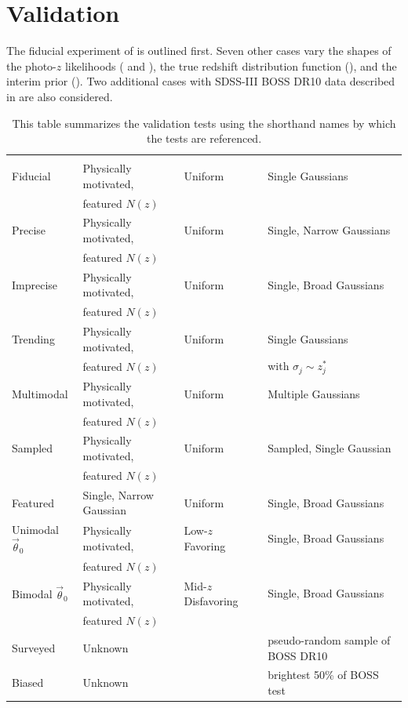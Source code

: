 \section{Validation}

The fiducial experiment of  is outlined first. 
Seven other cases vary the shapes of the photo-$z$ likelihoods ( and ), the true redshift distribution function (), and the interim prior ().  
Two additional cases with SDSS-III BOSS DR10 data described in  are also considered.

\begin{table}
	\begin{tabular}{llll}
		\textul{Title} & \textul{True $N(z)$} & \textul{Interim Prior} & 
		\textul{Photo-$z$ PDFs}\\
		Fiducial & Physically motivated, & Uniform & Single Gaussians\\
		& featured $N(z)$ &&\\
		Precise & Physically motivated, & Uniform & Single, Narrow Gaussians\\
		& featured $N(z)$ &&\\
		Imprecise & Physically motivated, & Uniform & Single, Broad Gaussians\\
		& featured $N(z)$ &&\\
		Trending & Physically motivated, & Uniform & Single Gaussians\\
		& featured $N(z)$ && with $\sigma_{j}\sim z^{*}_{j}$\\
		Multimodal & Physically motivated, & Uniform & Multiple Gaussians\\
		& featured $N(z)$ &&\\
		Sampled & Physically motivated, & Uniform & Sampled, Single Gaussian\\
		& featured $N(z)$ &&\\
		Featured & Single, Narrow Gaussian & Uniform & Single, Broad Gaussians\\
		Unimodal $\vec{\theta}_{0}$ & Physically motivated, & Low-$z$ Favoring & 
		Single, Broad Gaussians\\
		& featured $N(z)$ &&\\
		Bimodal $\vec{\theta}_{0}$& Physically motivated, & Mid-$z$ Disfavoring & 
		Single, Broad Gaussians\\
		& featured $N(z)$ &&\\
		Surveyed & Unknown & \citet{Sheldon2012} & pseudo-random sample of BOSS DR10\\
		Biased & Unknown & \citet{Sheldon2012} & brightest 50\% of BOSS test
	\end{tabular}
	\caption{This table summarizes the validation tests using the shorthand names by which the tests are referenced.}
\end{table}

